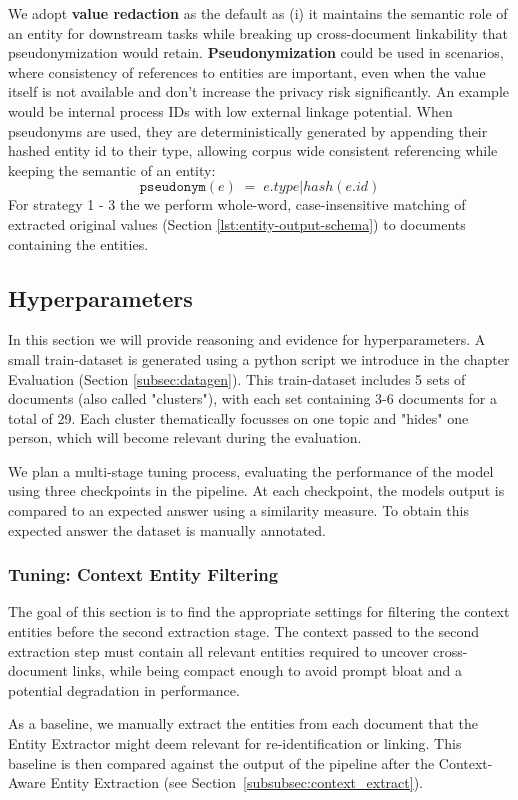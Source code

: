 We adopt \textbf{value redaction} as the default as (i) it maintains the semantic role of an entity for downstream tasks while breaking up cross-document linkability that pseudonymization would retain. \textbf{Pseudonymization} could be used in scenarios, where consistency of references to entities are important, even when the value itself is not available and don't increase the privacy risk significantly. An example would be internal process IDs with low external linkage potential. When pseudonyms are used, they are deterministically generated by appending their hashed entity id to their type, allowing corpus wide consistent referencing while keeping the semantic of an entity: 
\[
    \texttt{pseudonym}(e) \;=\; e.type \vert hash(e.id)
\]
For strategy 1 - 3 the we perform whole-word, case-insensitive matching of extracted original values (Section \ref{lst:entity-output-schema}) to documents containing the entities.

 
\subsection{Hyperparameters} 
In this section we will provide reasoning and evidence for hyperparameters. A small train-dataset is generated using a python script we introduce in the chapter Evaluation (Section \ref{subsec:datagen}). This train-dataset includes 5 sets of documents (also called "clusters"), with each set containing 3-6 documents for a total of 29. Each cluster thematically focusses on one topic and "hides" one person, which will become relevant during the evaluation.

We plan a multi-stage tuning process, evaluating the performance of the model using three checkpoints in the pipeline. At each checkpoint, the models output is compared to an expected answer using a similarity measure. To obtain this expected answer the dataset is manually annotated.

\subsubsection{Tuning: Context Entity Filtering}
The goal of this section is to find the appropriate settings for filtering the context entities before the second extraction stage. The context passed to the second extraction step must contain all relevant entities required to uncover cross-document links, while being compact enough to avoid prompt bloat and a potential degradation in performance. 

As a baseline, we manually extract the entities from each document that the Entity Extractor might deem relevant for re-identification or linking. This baseline is then compared against the output of the pipeline after the Context-Aware Entity Extraction (see Section~\ref{subsubsec:context_extract}). 

